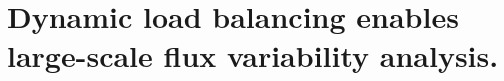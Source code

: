 \documentclass[12pt,a4paper]{book}
\begin{document}
\chapter*{Dynamic load balancing enables large-scale flux variability analysis.}



\end{document}

